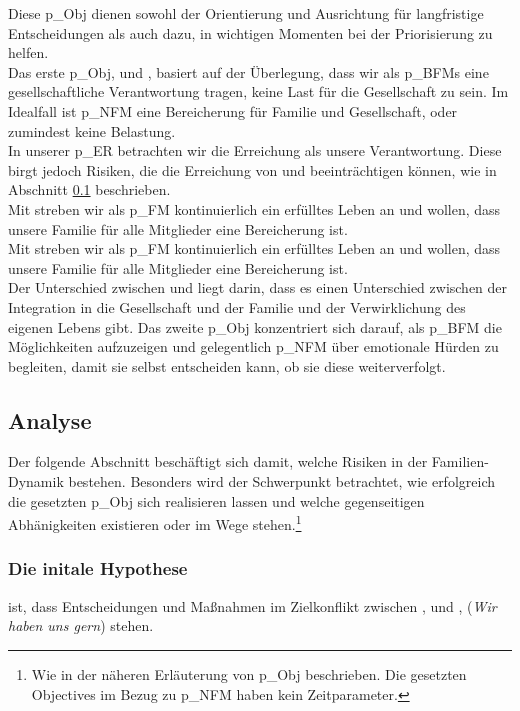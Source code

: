 Diese \gls{p_Obj} dienen sowohl der Orientierung und Ausrichtung für langfristige Entscheidungen als auch dazu, in wichtigen Momenten bei der Priorisierung zu helfen.\\


Das erste \gls{p_Obj}, \NFMOOne und \NFMOTwo, basiert auf der Überlegung, dass wir als \glspl{p_BFM} eine gesellschaftliche Verantwortung tragen, keine Last für die Gesellschaft zu sein. Im Idealfall ist \gls{p_NFM} eine Bereicherung für Familie und Gesellschaft, oder zumindest keine Belastung.\\


In unserer \gls{p_ER} betrachten wir die Erreichung als unsere Verantwortung. Diese birgt jedoch Risiken, die die Erreichung von \NFMOTwo und \NFMOThree beeinträchtigen können, wie in Abschnitt \ref{sec:Risiko_EKB} beschrieben.\\


Mit \NFMOFour streben wir als \gls{p_FM} kontinuierlich ein erfülltes Leben an und wollen, dass unsere Familie für alle Mitglieder eine Bereicherung ist.\\
Mit \NFMOFour streben wir als \gls{p_FM} kontinuierlich ein erfülltes Leben an und wollen, dass unsere Familie für alle Mitglieder eine Bereicherung ist.\\


Der Unterschied zwischen \NFMOOne und \NFMOFour liegt darin, dass es einen Unterschied zwischen der Integration in die Gesellschaft und der Familie und der Verwirklichung des eigenen Lebens gibt. Das zweite \gls{p_Obj} konzentriert sich darauf, als \gls{p_BFM} die Möglichkeiten aufzuzeigen und gelegentlich \gls{p_NFM} über emotionale Hürden zu begleiten, damit sie selbst entscheiden kann, ob sie diese weiterverfolgt.

\subsection{Analyse} \label{sec:Risiko_EKB}
Der folgende Abschnitt beschäftigt sich damit, welche Risiken in der Familien-Dynamik bestehen. Besonders wird der Schwerpunkt betrachtet, wie erfolgreich die gesetzten \gls{p_Obj} sich realisieren lassen und welche gegenseitigen Abhänigkeiten existieren oder im Wege stehen.\footnote{
	Wie in der näheren Erläuterung von \gls{p_Obj} beschrieben. Die gesetzten Objectives im Bezug zu \gls{p_NFM} haben kein Zeitparameter.
}

\subsubsection{Die initale Hypothese} ist, dass Entscheidungen und Maßnahmen im Zielkonflikt zwischen \NFMOOne, \NFMOTwo und \NFMOThree, \NFMOFour (\textit{Wir haben uns gern}) stehen.\\


